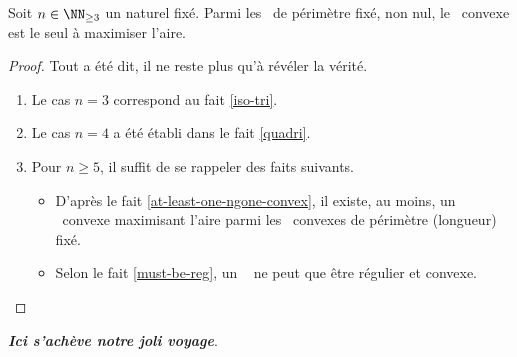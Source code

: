 \begin{fact}
    Soit $n \in \NN_{\geq3}$ un naturel fixé.
    Parmi les \ngones\ de périmètre fixé, non nul,
    le \nreg\ convexe est le seul à maximiser l'aire.
\end{fact}


\begin{proof}
    Tout a été dit, il ne reste plus qu'à révéler la vérité.
    \begin{enumerate}
        \item Le cas $n = 3$ correspond au fait \ref{iso-tri}.
        
        \item Le cas $n = 4$ a été établi dans le fait \ref{quadri}.
        
        \item Pour $n \geq 5$, il suffit de se rappeler des faits suivants.
        \begin{itemize}
            \item D'après le fait \ref{at-least-one-ngone-convex}, il existe, au moins, un \ngone\ convexe maximisant l'aire parmi les \ngones\ convexes de périmètre (longueur) fixé.

            \item Selon le fait \ref{must-be-reg}, un \ngone\  ne peut que être régulier et convexe.

        \end{itemize} 
	
	\null\vspace{-6.5ex}
    \end{enumerate}
\end{proof}

\bigskip
\hfill {\small\itshape\bfseries Ici s'achève notre joli voyage}.
